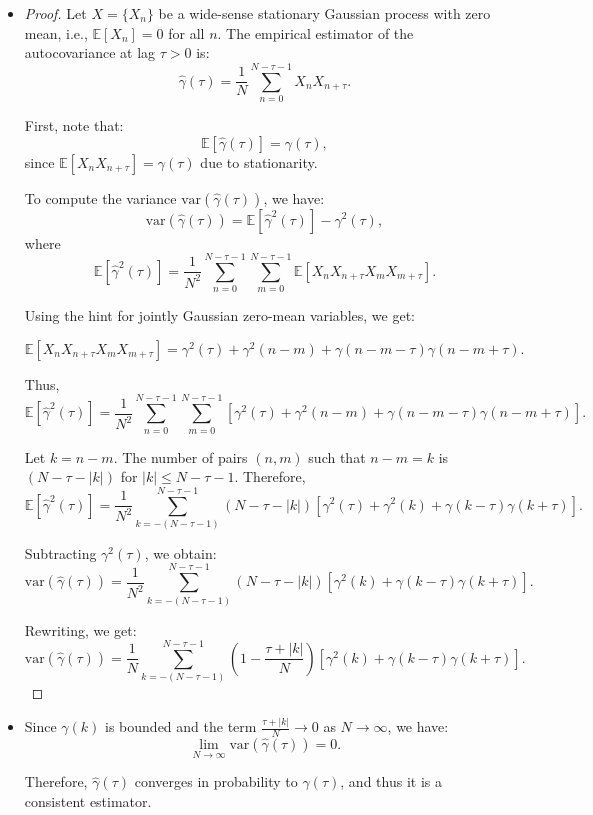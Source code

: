 \documentclass[11pt]{article}
\begin{document}
\begin{solution} %
    \begin{itemize}
        \item \begin{proof}
    Let $X = \{X_n\}$ be a wide-sense stationary Gaussian process with zero mean, i.e., $\mathbb{E}[X_n] = 0$ for all $n$. The empirical estimator of the autocovariance at lag $\tau > 0$ is:
    \[
    \hat{\gamma}(\tau) = \frac{1}{N} \sum_{n=0}^{N-\tau-1} X_n X_{n+\tau}.
    \]
    
    First, note that:
    \[
    \mathbb{E}[\hat{\gamma}(\tau)] = \gamma(\tau),
    \]
    since $\mathbb{E}[X_n X_{n+\tau}] = \gamma(\tau)$ due to stationarity.
    
    To compute the variance $\text{var}(\hat{\gamma}(\tau))$, we have:
    \[
    \text{var}(\hat{\gamma}(\tau)) = \mathbb{E}[\hat{\gamma}^2(\tau)] - \gamma^2(\tau),
    \]
    where
    \[
    \mathbb{E}[\hat{\gamma}^2(\tau)] = \frac{1}{N^2} \sum_{n=0}^{N-\tau-1} \sum_{m=0}^{N-\tau-1} \mathbb{E}[X_n X_{n+\tau} X_m X_{m+\tau}].
    \]
    
    Using the hint for jointly Gaussian zero-mean variables, we get:
    
    \[
    \mathbb{E}[X_n X_{n+\tau} X_m X_{m+\tau}] = \gamma^2(\tau) + \gamma^2(n - m) + \gamma(n - m - \tau) \gamma(n - m + \tau).
    \]
    
    Thus,
    \[
    \mathbb{E}[\hat{\gamma}^2(\tau)] = \frac{1}{N^2} \sum_{n=0}^{N-\tau-1} \sum_{m=0}^{N-\tau-1} \left[ \gamma^2(\tau) + \gamma^2(n - m) + \gamma(n - m - \tau)\gamma(n - m + \tau) \right].
    \]
    
    Let $k = n - m$. The number of pairs $(n, m)$ such that $n - m = k$ is $(N - \tau - |k|)$ for $|k| \leq N - \tau - 1$. Therefore,
    \[
    \mathbb{E}[\hat{\gamma}^2(\tau)] = \frac{1}{N^2} \sum_{k=-(N-\tau-1)}^{N-\tau-1} (N - \tau - |k|) \left[ \gamma^2(\tau) + \gamma^2(k) + \gamma(k - \tau)\gamma(k + \tau) \right].
    \]
    
    Subtracting $\gamma^2(\tau)$, we obtain:
    \[
    \text{var}(\hat{\gamma}(\tau)) = \frac{1}{N^2} \sum_{k=-(N-\tau-1)}^{N-\tau-1} (N - \tau - |k|) \left[ \gamma^2(k) + \gamma(k - \tau)\gamma(k + \tau) \right].
    \]
    
    Rewriting, we get:
    \[
    \text{var}(\hat{\gamma}(\tau)) = \frac{1}{N} \sum_{k=-(N-\tau-1)}^{N-\tau-1} \left(1 - \frac{\tau + |k|}{N}\right) \left[ \gamma^2(k) + \gamma(k - \tau)\gamma(k + \tau) \right].
    \]
    
    \end{proof}
    
        \item Since $\gamma(k)$ is bounded and the term $\frac{\tau + |k|}{N} \to 0$ as $N \to \infty$, we have:
    \[
    \lim_{N \to \infty} \text{var}(\hat{\gamma}(\tau)) = 0.
    \]
    
    Therefore, $\hat{\gamma}(\tau)$ converges in probability to $\gamma(\tau)$, and thus it is a consistent estimator.
    \end{itemize}
        
\end{solution}  %
    
\end{document}
